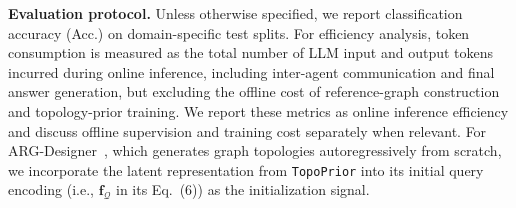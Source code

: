 \documentclass[lettersize,journal]{IEEEtran}
\theoremstyle{plain}
\begin{document}
\noindent\textbf{Evaluation protocol.}
Unless otherwise specified, we report classification accuracy (Acc.) on domain-specific test splits. For efficiency analysis, token consumption is measured as the total number of LLM input and output tokens incurred during online inference, including inter-agent communication and final answer generation, but excluding the offline cost of reference-graph construction and topology-prior training. We report these metrics as online inference efficiency and discuss offline supervision and training cost separately when relevant. For ARG-Designer~\cite{DBLP:conf/aaai/LiLWZP26}, which generates graph topologies autoregressively from scratch, we incorporate the latent representation from \texttt{TopoPrior} into its initial query encoding (i.e., $\mathbf{f}_{\mathcal{Q}}$ in its Eq.~(6)) as the initialization signal.
\end{document}
